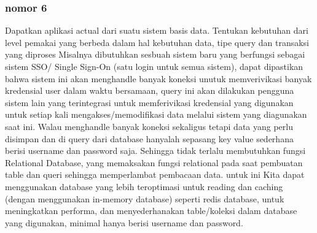 \documentclass{article}
\begin{document}
\subsubsection*{nomor 6}
Dapatkan  aplikasi actual dari suatu sistem basis data. Tentukan kebutuhan dari level pemakai yang berbeda dalam hal kebutuhan data, tipe query dan transaksi yang  diproses
\bigbreak
Misalnya dibutuhkan sesbuah sistem baru yang berfungsi sebagai sistem SSO/ Single Sign-On (satu login untuk semua sistem), dapat dipastikan bahwa sistem ini akan menghandle banyak koneksi unutuk memverivikasi banyak kredensial user dalam waktu bersamaan, query ini akan dilakukan  pengguna sistem lain yang terintegrasi untuk memferivikasi kredensial yang digunakan untuk setiap kali mengakses/memodifikasi data melalui sistem yang diagunakan saat ini. 
Walau menghandle banyak koneksi sekaligus tetapi data yang perlu disimpan dan di query dari database hanyalah sepasang key value sederhana berisi username dan password saja. Sehingga tidak terlalu membutuhkan fungsi Relational Database, yang memaksakan fungsi relational pada saat pembuatan table dan queri sehingga memperlambat pembacaan data. untuk ini Kita dapat menggunakan database yang lebih teroptimasi untuk reading dan caching (dengan menggunakan in-memory database) seperti redis database, untuk meningkatkan performa, dan menyederhanakan table/koleksi dalam database yang digunakan, minimal hanya berisi username dan password.

% 
% 
\end{document}
